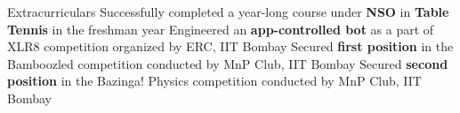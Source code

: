 \begin{rubric}{Extracurriculars}
	\entry*[2019] Successfully completed a year-long course under{ \bf NSO} in{ \bf Table Tennis} in the freshman year
	\entry*[2019\phantom{}] Engineered an \textbf{app-controlled bot} as a part of XLR8 competition organized by ERC, IIT Bombay
	\entry*[2020] Secured \textbf{first position} in the Bamboozled competition conducted by MnP Club, IIT Bombay
	\entry*[2019] Secured \textbf{second position} in the Bazinga! Physics competition conducted by MnP Club, IIT Bombay
\end{rubric}
